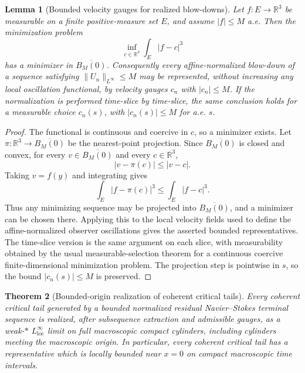 \documentclass[11pt]{amsart}
\numberwithin{equation}{section}
\theoremstyle{plain}
\newtheorem{theorem}{Theorem}[section]
\newtheorem{lemma}[theorem]{Lemma}
\theoremstyle{definition}
\theoremstyle{remark}
\newcommand{\loc}{\mathrm{loc}}
\begin{document}
\begin{lemma}[Bounded velocity gauges for realized blow-downs]
\label{lem:bounded-velocity-gauges-blowdown}
Let \(f:E\to\mathbb R^3\) be measurable on a finite positive-measure set
\(E\), and assume \(|f|\le M\) a.e.  Then the minimization problem
\[
   \inf_{c\in\mathbb R^3}\int_E |f-c|^3
\]
has a minimizer in \(\overline{B_M(0)}\).  Consequently every
affine-normalized blow-down of a sequence satisfying
\(\|U_n\|_{L^\infty}\le M\) may be represented, without increasing any local
oscillation functional, by velocity gauges \(c_n\) with \(|c_n|\le M\).  If the
normalization is performed time-slice by time-slice, the same conclusion holds
for a measurable choice \(c_n(s)\), with \(|c_n(s)|\le M\) for a.e. \(s\).
\end{lemma}

\begin{proof}
The functional is continuous and coercive in \(c\), so a minimizer exists.  Let
\(\pi:\mathbb R^3\to\overline{B_M(0)}\) be the nearest-point projection.  Since
\(\overline{B_M(0)}\) is closed and convex, for every \(v\in\overline{B_M(0)}\)
and every \(c\in\mathbb R^3\),
\[
   |v-\pi(c)|\le |v-c|.
\]
Taking \(v=f(y)\) and integrating gives
\[
   \int_E |f-\pi(c)|^3\le \int_E |f-c|^3 .
\]
Thus any minimizing sequence may be projected into \(\overline{B_M(0)}\), and a
minimizer can be chosen there.  Applying this to the local velocity fields used
to define the affine-normalized observer oscillations gives the asserted
bounded representatives.  The time-slice version is the same argument on each
slice, with measurability obtained by the usual measurable-selection theorem
for a continuous coercive finite-dimensional minimization problem.  The
projection step is pointwise in \(s\), so the bound \(|c_n(s)|\le M\) is
preserved.
\end{proof}

\begin{theorem}[Bounded-origin realization of coherent critical tails]
\label{thm:bounded-origin-realization-coherent-tails}
Every coherent critical tail generated by a bounded normalized residual
Navier--Stokes terminal sequence is realized, after subsequence extraction and
admissible gauges, as a weak-\(*\) \(L^\infty_{\loc}\) limit on full
macroscopic compact cylinders, including cylinders meeting the macroscopic
origin.  In particular, every coherent critical tail has a representative which
is locally bounded near \(x=0\) on compact macroscopic time intervals.
\end{theorem}
\end{document}
